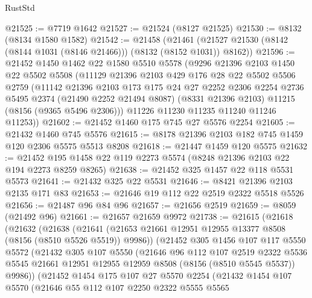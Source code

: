 \begin{lexlean}{RustStd}
\begin{coremodule}
@21525 := @7719 @1642
@21527 := @21524 (@8127 @21525)
@21530 := @8132 (@8134 @1580 @1582)
@21542 := @21458
    (@21461 (@21527 @21530 (@8142 (@8144 @1031 (@8146 @21466))) (@8132 (@8152 @1031)) @8162))
@21596 := @21452
    @1450
    @1462
    @22
    @1580
    @5510
    @5578
    (@9296
      @21396
      @2103
      @1450
      @22
      @5502
      @5508
      (@11129
        @21396
        @2103
        @429
        @176
        @28
        @22
        @5502
        @5506
        @2759
        (@11142
          @21396
          @2103
          @173
          @175
          @24
          @27
          @2252
          @2306
          @2254
          @2736
          @5495
          @2374
          (@21490 @2252 @21494 @8087)
          (@8331 @21396 @2103)
          @11215
          (@8156 (@9365 @5496 @2306)))
        @11226
        @11230
        @11235
        @11240
        @11246
        @11253))
@21602 := @21452 @1460 @175 @745 @27 @5576 @2254
@21605 := @21432 @1460 @745 @5576
@21615 := @8178 @21396 @2103 @182 @745 @1459 @120 @2306 @5575 @5513 @8208
@21618 := @21447 @1459 @120 @5575
@21632 := @21452 @195 @1458 @22 @119 @2273 @5574 (@8248 @21396 @2103 @22 @194 @2273 @8259 @8265)
@21638 := @21452 @325 @1457 @22 @118 @5531 @5573
@21641 := @21432 @325 @22 @5531
@21646 := @8421 @21396 @2103 @2135 @171 @83
@21653 := @21646 @19 @112 @22 @2519 @2322 @5518 @5526
@21656 := @21487 @96 @84 @96
@21657 := @21656 @2519
@21659 := @8059 (@21492 @96)
@21661 := @21657 @21659 @9972
@21738 := @21615
    (@21618
      (@21632
        (@21638
          (@21641 (@21653 @21661 @12951 @12955 @13377 @8508 (@8156 (@8510 @5526 @5519)) @9986))
          (@21452
            @305
            @1456
            @107
            @117
            @5550
            @5572
            (@21432
              @305
              @107
              @5550
              (@21646
                @96
                @112
                @107
                @2519
                @2322
                @5536
                @5545
                @21661
                @12951
                @12955
                @12959
                @8508
                (@8156 (@8510 @5545 @5537))
                @9986))
            (@21452
              @1454
              @175
              @107
              @27
              @5570
              @2254
              (@21432
                @1454
                @107
                @5570
                (@21646
                  @55
                  @112
                  @107
                  @2250
                  @2322
                  @5555
                  @5565

\end{coremodule}
\end{lexlean}
